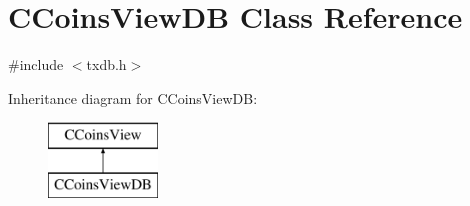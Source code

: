 \hypertarget{class_c_coins_view_d_b}{}\section{C\+Coins\+View\+D\+B Class Reference}
\label{class_c_coins_view_d_b}


{\ttfamily \#include $<$txdb.\+h$>$}

Inheritance diagram for C\+Coins\+View\+D\+B\+:\begin{figure}[H]
\begin{center}
\leavevmode
\includegraphics[height=2.000000cm]{class_c_coins_view_d_b}
\end{center}
\end{figure}
